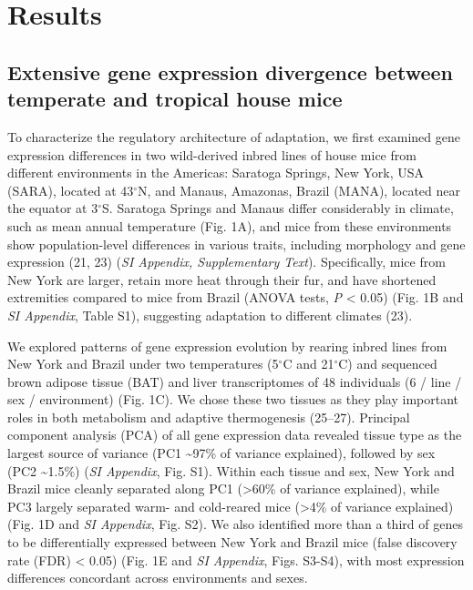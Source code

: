 \documentclass[9pt,twocolumn,twoside,lineno]{pnas-new}
\begin{document}
\hypertarget{results}{%
\section*{Results}\label{results}}

\hypertarget{extensive-gene-expression-divergence-between-temperate-and-tropical-house-mice}{%
\subsection*{Extensive gene expression divergence between temperate and
tropical house
mice}\label{extensive-gene-expression-divergence-between-temperate-and-tropical-house-mice}}

To characterize the regulatory architecture of adaptation, we first
examined gene expression differences in two wild-derived inbred lines of
house mice from different environments in the Americas: Saratoga
Springs, New York, USA (SARA), located at 43\(^{\circ}\)N, and Manaus,
Amazonas, Brazil (MANA), located near the equator at 3\(^{\circ}\)S.
Saratoga Springs and Manaus differ considerably in climate, such as mean
annual temperature (Fig. 1A), and mice from these environments show
population-level differences in various traits, including morphology and
gene expression (21, 23) (\emph{SI Appendix, Supplementary Text}).
Specifically, mice from New York are larger, retain more heat through
their fur, and have shortened extremities compared to mice from Brazil
(ANOVA tests, \emph{P} \textless{} 0.05) (Fig. 1B and \emph{SI
Appendix}, Table S1), suggesting adaptation to different climates (23).

\vspace{-1pt}

We explored patterns of gene expression evolution by rearing inbred
lines from New York and Brazil under two temperatures (5\(^{\circ}\)C
and 21\(^{\circ}\)C) and sequenced brown adipose tissue (BAT) and liver
transcriptomes of 48 individuals (6 / line / sex / environment) (Fig.
1C). We chose these two tissues as they play important roles in both
metabolism and adaptive thermogenesis (25--27). Principal component
analysis (PCA) of all gene expression data revealed tissue type as the
largest source of variance (PC1 \textasciitilde97\% of variance
explained), followed by sex (PC2 \textasciitilde1.5\%) (\emph{SI
Appendix}, Fig. S1). Within each tissue and sex, New York and Brazil
mice cleanly separated along PC1 (\textgreater60\% of variance
explained), while PC3 largely separated warm- and cold-reared mice
(\textgreater4\% of variance explained) (Fig. 1D and \emph{SI Appendix},
Fig. S2). We also identified more than a third of genes to be
differentially expressed between New York and Brazil mice (false
discovery rate (FDR) \textless{} 0.05) (Fig. 1E and \emph{SI Appendix},
Figs. S3-S4), with most expression differences concordant across
environments and sexes.
\end{document}

